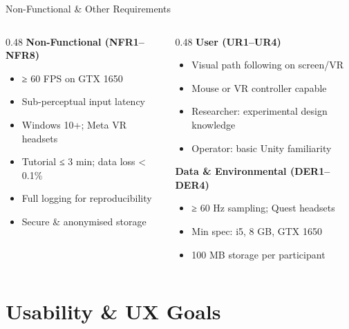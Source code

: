 \documentclass[aspectratio=169, 10pt]{beamer}
\begin{document}
\begin{frame}{Non-Functional \& Other Requirements}
  \begin{columns}[T]
    \begin{column}{0.48\textwidth}
      \textbf{Non-Functional (NFR1--NFR8)}
      \begin{itemize}
        \item ≥ 60 FPS on GTX 1650
        \item Sub-perceptual input latency
        \item Windows 10+; Meta VR headsets
        \item Tutorial ≤ 3 min; data loss < 0.1\%
        \item Full logging for reproducibility
        \item Secure \& anonymised storage
      \end{itemize}
    \end{column}
    \begin{column}{0.48\textwidth}
      \textbf{User (UR1--UR4)}
      \begin{itemize}
        \item Visual path following on screen/VR
        \item Mouse or VR controller capable
        \item Researcher: experimental design knowledge
        \item Operator: basic Unity familiarity
      \end{itemize}
      \vspace{0.4em}
      \textbf{Data \& Environmental (DER1--DER4)}
      \begin{itemize}
        \item ≥ 60 Hz sampling; Quest headsets
        \item Min spec: i5, 8 GB, GTX 1650
        \item 100 MB storage per participant
      \end{itemize}
    \end{column}
  \end{columns}
\end{frame}

\section{Usability \& UX Goals}
\end{document}

